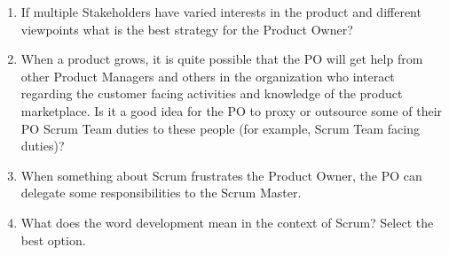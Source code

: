 \begin{enumerate}
	\item If multiple Stakeholders have varied interests in the product and different viewpoints what is the best strategy for the Product Owner?

	\item When a product grows, it is quite possible that the PO will get help from other Product Managers and others in the organization who interact regarding the customer facing activities and knowledge of the product marketplace. Is it a good idea for the PO to proxy or outsource some of their PO Scrum Team duties to these people (for example, Scrum Team facing duties)?

	\item When something about Scrum frustrates the Product Owner, the PO can delegate some responsibilities to the Scrum Master.

	\newpage

	\item What does  the word  development  mean in the context of Scrum? Select the best option.


\end{enumerate}
